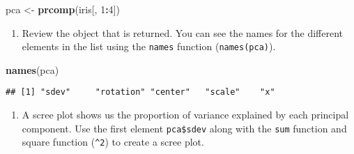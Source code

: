 \documentclass[]{article}
\newenvironment{Shaded}{\begin{snugshade}}{\end{snugshade}}
\newcommand{\DataTypeTok}[1]{\textcolor[rgb]{0.13,0.29,0.53}{#1}}
\newcommand{\DecValTok}[1]{\textcolor[rgb]{0.00,0.00,0.81}{#1}}
\newcommand{\KeywordTok}[1]{\textcolor[rgb]{0.13,0.29,0.53}{\textbf{#1}}}
\newcommand{\NormalTok}[1]{#1}
\newcommand{\OperatorTok}[1]{\textcolor[rgb]{0.81,0.36,0.00}{\textbf{#1}}}
\newcommand{\StringTok}[1]{\textcolor[rgb]{0.31,0.60,0.02}{#1}}
\providecommand{\tightlist}{%
  \setlength{\itemsep}{0pt}\setlength{\parskip}{0pt}}
\begin{document}
\begin{Shaded}
\begin{Highlighting}[]
\NormalTok{pca <-}\StringTok{ }\KeywordTok{prcomp}\NormalTok{(iris[, }\DecValTok{1}\OperatorTok{:}\DecValTok{4}\NormalTok{])}
\end{Highlighting}
\end{Shaded}

\begin{enumerate}
\def\labelenumi{\arabic{enumi})}
\setcounter{enumi}{2}
\tightlist
\item
  Review the object that is returned. You can see the names for the
  different elements in the list using the \texttt{names} function
  (\texttt{names(pca)}).
\end{enumerate}

\begin{Shaded}
\begin{Highlighting}[]
\KeywordTok{names}\NormalTok{(pca)}
\end{Highlighting}
\end{Shaded}

\begin{verbatim}
## [1] "sdev"     "rotation" "center"   "scale"    "x"
\end{verbatim}

\begin{enumerate}
\def\labelenumi{\arabic{enumi})}
\setcounter{enumi}{3}
\tightlist
\item
  A scree plot shows us the proportion of variance explained by each
  principal component. Use the first element \texttt{pca\$sdev} along
  with the \texttt{sum} function and square function (\texttt{\^{}2}) to
  create a scree plot.
\end{enumerate}

\begin{Shaded}
\end{Shaded}
\end{document}
